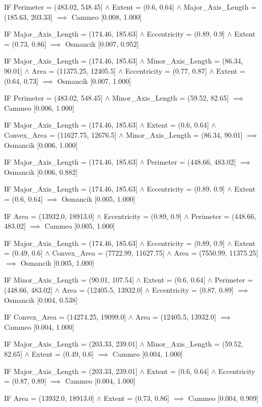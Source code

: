 IF Perimeter = (483.02, 548.45] $\land$ Extent = (0.6, 0.64] $\land$ Major_Axis_Length = (185.63, 203.33] $\implies$ Cammeo [0.008, 1.000]

IF Major_Axis_Length = (174.46, 185.63] $\land$ Eccentricity = (0.89, 0.9] $\land$ Extent = (0.73, 0.86] $\implies$ Osmancik [0.007, 0.952]

IF Major_Axis_Length = (174.46, 185.63] $\land$ Minor_Axis_Length = (86.34, 90.01] $\land$ Area = (11375.25, 12405.5] $\land$ Eccentricity = (0.77, 0.87] $\land$ Extent = (0.64, 0.73] $\implies$ Osmancik [0.007, 1.000]

IF Perimeter = (483.02, 548.45] $\land$ Minor_Axis_Length = (59.52, 82.65] $\implies$ Cammeo [0.006, 1.000]

IF Major_Axis_Length = (174.46, 185.63] $\land$ Extent = (0.6, 0.64] $\land$ Convex_Area = (11627.75, 12676.5] $\land$ Minor_Axis_Length = (86.34, 90.01] $\implies$ Osmancik [0.006, 1.000]

IF Major_Axis_Length = (174.46, 185.63] $\land$ Perimeter = (448.66, 483.02] $\implies$ Osmancik [0.006, 0.882]

IF Major_Axis_Length = (174.46, 185.63] $\land$ Eccentricity = (0.89, 0.9] $\land$ Extent = (0.6, 0.64] $\implies$ Osmancik [0.005, 1.000]

IF Area = (13932.0, 18913.0] $\land$ Eccentricity = (0.89, 0.9] $\land$ Perimeter = (448.66, 483.02] $\implies$ Cammeo [0.005, 1.000]

IF Major_Axis_Length = (174.46, 185.63] $\land$ Eccentricity = (0.89, 0.9] $\land$ Extent = (0.49, 0.6] $\land$ Convex_Area = (7722.99, 11627.75] $\land$ Area = (7550.99, 11375.25] $\implies$ Osmancik [0.005, 1.000]

IF Minor_Axis_Length = (90.01, 107.54] $\land$ Extent = (0.6, 0.64] $\land$ Perimeter = (448.66, 483.02] $\land$ Area = (12405.5, 13932.0] $\land$ Eccentricity = (0.87, 0.89] $\implies$ Osmancik [0.004, 0.538]

IF Convex_Area = (14274.25, 19099.0] $\land$ Area = (12405.5, 13932.0] $\implies$ Cammeo [0.004, 1.000]

IF Major_Axis_Length = (203.33, 239.01] $\land$ Minor_Axis_Length = (59.52, 82.65] $\land$ Extent = (0.49, 0.6] $\implies$ Cammeo [0.004, 1.000]

IF Major_Axis_Length = (203.33, 239.01] $\land$ Extent = (0.6, 0.64] $\land$ Eccentricity = (0.87, 0.89] $\implies$ Cammeo [0.004, 1.000]

IF Area = (13932.0, 18913.0] $\land$ Extent = (0.73, 0.86] $\implies$ Cammeo [0.004, 0.909]


